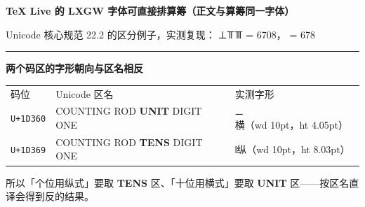 \documentclass[11pt]{article}
\newcommand\R[1]{{\RodFont #1}}
\begin{document}
{\bfseries TeX Live 的 LXGW 字体可直接排算筹（正文与算筹同一字体）}

\medskip
Unicode 核心规范 22.2 的区分例子，实测复现：\quad
\R{𝍥𝍯𝍰} = 6708，\qquad \R{𝍮𝍦𝍰} = 678

\medskip\hrule\medskip
{\bfseries 两个码区的字形朝向与区名相反}

\medskip
\begin{tabular}{@{}lll@{}}
码位 & Unicode 区名 & 实测字形 \\
\texttt{U+1D360} & COUNTING ROD \textbf{UNIT} DIGIT ONE & \R{𝍠}\quad 横（wd 10pt，ht 4.05pt） \\
\texttt{U+1D369} & COUNTING ROD \textbf{TENS} DIGIT ONE & \R{𝍩}\quad 纵（wd 10pt，ht 8.03pt） \\
\end{tabular}

\medskip
{\small 所以「个位用纵式」要取 \textbf{TENS} 区、「十位用横式」要取 \textbf{UNIT} 区——按区名直译会得到反的结果。}
\end{document}
